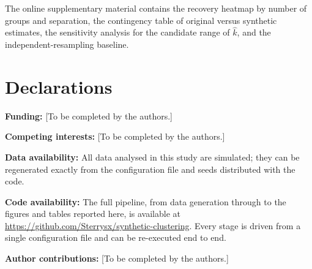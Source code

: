 \documentclass[pdflatex,sn-basic]{sn-jnl}
\begin{document}
\backmatter

The online supplementary material contains the recovery heatmap by number of
groups and separation, the contingency table of original versus synthetic
estimates, the sensitivity analysis for the candidate range of $\hat{k}$, and
the independent-resampling baseline.

\section*{Declarations}

\noindent \textbf{Funding:} [To be completed by the authors.]

\noindent \textbf{Competing interests:} [To be completed by the authors.]

\noindent \textbf{Data availability:} All data analysed in this study are
  simulated; they can be regenerated exactly from the configuration file and
  seeds distributed with the code.

\noindent \textbf{Code availability:} The full pipeline, from data generation
  through to the figures and tables reported here, is available at
  \url{https://github.com/Sterrysx/synthetic-clustering}. Every stage is driven
  from a single configuration file and can be re-executed end to end.

\noindent \textbf{Author contributions:} [To be completed by the authors.]


\end{document}
